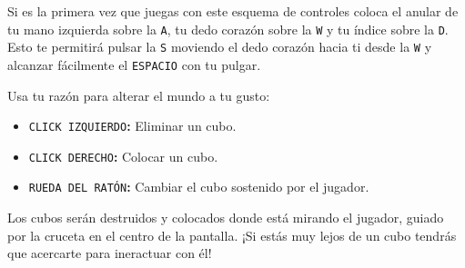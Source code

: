 Si es la primera vez que juegas con este esquema de controles coloca el anular de tu mano izquierda sobre la \texttt{A}, tu dedo corazón sobre la \texttt{W} y tu índice sobre la \texttt{D}.
Esto te permitirá pulsar la \texttt{S} moviendo el dedo corazón hacia ti desde la \texttt{W} y alcanzar fácilmente el \texttt{ESPACIO} con tu pulgar.

Usa tu razón para alterar el mundo a tu gusto:

\begin{itemize}
	\item
		\texttt{CLICK IZQUIERDO}\textbf{:}
		Eliminar un cubo.
	\item
		\texttt{CLICK DERECHO}\textbf{:}
		Colocar un cubo.
	\item
		\texttt{RUEDA DEL RATÓN}\textbf{:}
		Cambiar el cubo sostenido por el jugador.
\end{itemize}

Los cubos serán destruidos y colocados donde está mirando el jugador, guiado por la cruceta en el centro de la pantalla.
¡Si estás muy lejos de un cubo tendrás que acercarte para ineractuar con él!
